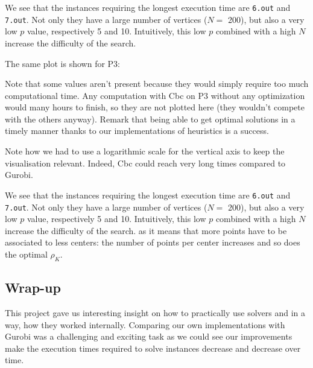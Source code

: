 \documentclass[a4paper,10pt]{article}
\begin{document}
We see that the instances requiring the longest execution time are \texttt{6.out} and \texttt{7.out}. Not only they have a large number of vertices ($N = $ 200), but also a very low $p$ value, respectively 5 and 10. Intuitively, this low $p$ combined with a high $N$ increase the difficulty of the search.

The same plot is shown for P3:

Note that some values aren't present because they would simply require too much computational time. Any computation with Cbc on P3 without any optimization would many hours to finish, so they are not plotted here (they wouldn't compete with the others anyway). Remark that being able to get optimal solutions in a timely manner thanks to our implementations of heuristics is a success.



    Note how we had to use a logarithmic scale for the vertical axis to keep the visualisation relevant. Indeed, Cbc could reach very long times compared to Gurobi.

    We see that the instances requiring the longest execution time are \texttt{6.out} and \texttt{7.out}. Not only they have a large number of vertices ($N = $ 200), but also a very low $p$ value, respectively 5 and 10. Intuitively, this low $p$ combined with a high $N$ increase the difficulty of the search. as it means that more points have to be associated to less centers: the number of points per center increases and so does the optimal $\rho_K$.
	
	\subsection{Wrap-up}
	This project gave us interesting insight on how to practically use solvers  and  in a way, how they worked internally. Comparing our own implementations with Gurobi was a challenging and exciting task as we could see our improvements make the execution times required to solve instances decrease and decrease over time.
	
\end{document}
